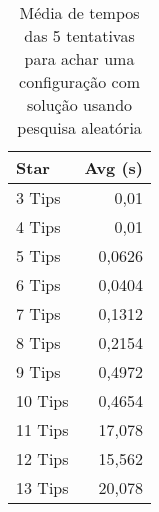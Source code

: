 \begin{table}[htbp]
  \centering
  \caption{Média de tempos das 5 tentativas para achar uma configuração com solução usando pesquisa aleatória}
    \begin{tabular}{lr}
    \hline
    Star  & \multicolumn{1}{l}{Avg (s)} \\ \hline\hline
    3 Tips & 0,01 \\
    4 Tips & 0,01 \\
    5 Tips & 0,0626 \\
    6 Tips & 0,0404 \\
    7 Tips & 0,1312 \\
    8 Tips & 0,2154 \\
    9 Tips & 0,4972 \\
    10 Tips & 0,4654 \\
    11 Tips & 17,078 \\
    12 Tips & 15,562 \\
    13 Tips & 20,078 \\ \hline
    \end{tabular}%
  \label{tab:find_ones_avg}%
\end{table}%
